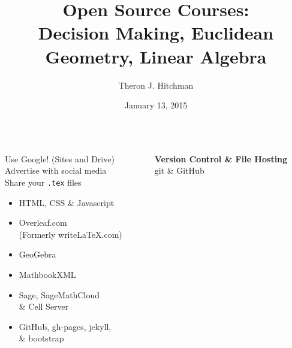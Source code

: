\documentclass[final]{beamer}
\title[Open Courses]{Open Source Courses:\\ Decision Making, Euclidean Geometry, Linear Algebra}
\author[Hitchman]{Theron J. Hitchman}
\institute[UNI]{University of Northern Iowa}
\date{January 13, 2015}
\begin{document}
  \begin{frame}{} 
    \begin{columns}[t]
      \begin{column}{.31\linewidth}
       \centering
        \begin{block}{}
          \centering
          {\Large
          Use Google! (Sites and Drive)\\
          Advertise with social media\\
          Share your \texttt{.tex} files\\
          }
        \end{block}
        
        \begin{block}{}
         \centering
         {\Large
          \begin{itemize}
          \item HTML, CSS \& Javascript
          \item Overleaf.com\\ (Formerly writeLaTeX.com)
          \item GeoGebra
          \end{itemize}
          }
        \end{block}

        \begin{block}{}
          \centering
          {\Large
          \begin{itemize}
          \item MathbookXML 
          \item Sage, SageMathCloud \\ \& Cell Server 
          \item GitHub, gh-pages, jekyll, \\ \& bootstrap
          \end{itemize}
          }
        \end{block}        
        
      \end{column}
      
       \begin{column}{.31\linewidth}
        \vspace{.15\textheight}
        \begin{block}{}
          \centering
          {\Large
          \textbf{Version Control \& File Hosting}\\ 
          git \& GitHub 
          }
      	 

\end{block}
\end{column}
\end{columns}
\end{frame}
\end{document}
